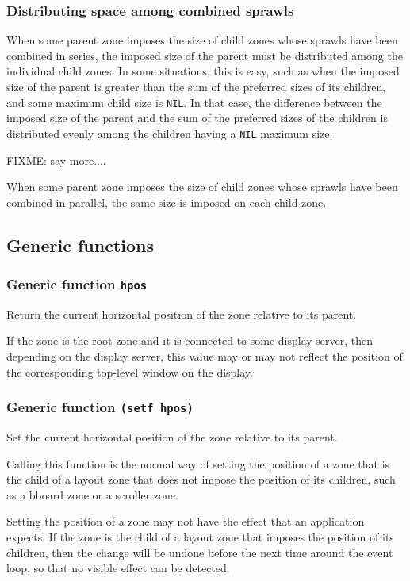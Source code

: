 \documentclass{report}
\begin{document}
\subsubsection{Distributing space among combined sprawls}

When some parent zone imposes the size of child zones whose sprawls
have been combined in series, the imposed size of the parent must be
distributed among the individual child zones.  In some situations,
this is easy, such as when the imposed size of the parent is greater
than the sum of the preferred sizes of its children, and some maximum
child size is \texttt{NIL}.  In that case, the difference between the
imposed size of the parent and the sum of the preferred sizes of the
children is distributed evenly among the children having a
\texttt{NIL} maximum size.

FIXME: say more....

When some parent zone imposes the size of child zones whose sprawls
have been combined in parallel, the same size is imposed on each child
zone.

\subsection{Generic functions}

\subsubsection{Generic function \texttt{hpos}}

Return the current horizontal position of the zone relative to its
parent.  

If the zone is the root zone and it is connected to some display
server, then depending on the display server, this value may or
may not reflect the position of the corresponding top-level
window on the display. 

\subsubsection{Generic function \texttt{(setf hpos)}}

Set the current horizontal position of the zone relative to its
parent.  

Calling this function is the normal way of setting the position of
a zone that is the child of a layout zone that does not impose the
position of its children, such as a bboard zone or a scroller
zone.

Setting the position of a zone may not have the effect that an
application expects.  If the zone is the child of a layout zone
that imposes the position of its children, then the change will be
undone before the next time around the event loop, so that no
visible effect can be detected.  
\end{document}
